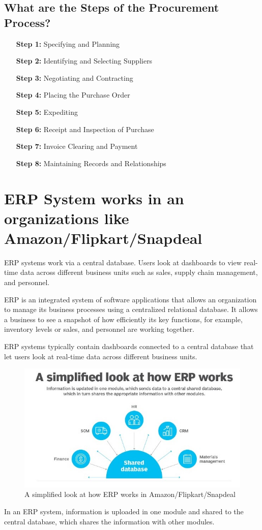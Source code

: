 \documentclass[a4paper]{article}
\begin{document}
\subsection{What are the Steps of the Procurement Process?}
\begin{enumerate}
  \item [\textbf{Step 1:}] Specifying and Planning
  \item [\textbf{Step 2:}] Identifying and Selecting Suppliers
  \item [\textbf{Step 3:}] Negotiating and Contracting
  \item [\textbf{Step 4:}] Placing the Purchase Order
  \item [\textbf{Step 5:}] Expediting
  \item [\textbf{Step 6:}] Receipt and Inspection of Purchase
  \item [\textbf{Step 7:}] Invoice Clearing and Payment
  \item [\textbf{Step 8:}] Maintaining Records and Relationships
\end{enumerate}

\section{ERP System works in an organizations like Amazon/Flipkart/Snapdeal}
ERP systems work via a central database. Users look at dashboards to view real-time data across different business units such as sales, supply chain management, and personnel.

ERP is an integrated system of software applications that allows an organization to manage its business processes using a centralized relational database. It allows a business to see a snapshot of how efficiently its key functions, for example, inventory levels or sales, and personnel are working together.

ERP systems typically contain dashboards connected to a central database that let users look at real-time data across different business units.

\begin{figure}[h]
  \centering
  \includegraphics[scale=0.4]{howerpworks}
  \caption{A simplified look at how ERP works in Amazon/Flipkart/Snapdeal}
\end{figure}
In an ERP system, information is uploaded in one module and shared to the central database, which shares the information with other modules.
\end{document}
